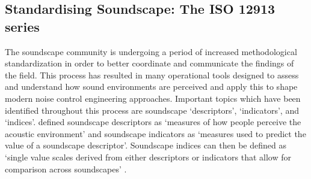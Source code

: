 






\subsection{Standardising Soundscape: The ISO 12913 series}
The soundscape community is undergoing a period of increased methodological standardization in order to better coordinate and communicate the findings of the field. This process has resulted in many operational tools designed to assess and understand how sound environments are perceived and apply this to shape modern noise control engineering approaches. Important topics which have been identified throughout this process are soundscape `descriptors', `indicators', and `indices'. \citet{Aletta2016Soundscape} defined soundscape descriptors as `measures of how people perceive the acoustic environment' and soundscape indicators as `measures used to predict the value of a soundscape descriptor'. Soundscape indices can then be defined as `single value scales derived from either descriptors or indicators that allow for comparison across soundscapes' \citep{Kang2019Towards}.

